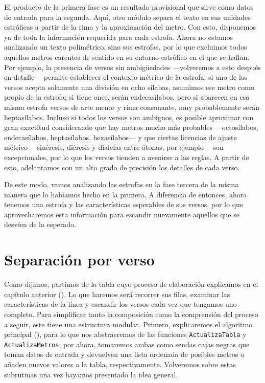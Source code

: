 El producto de la primera fase es un resultado provisional que sirve como datos de entrada para la segunda. Aquí, otro módulo separa el texto en sus unidades estróficas a partir de la rima y la aproximación del metro. Con esto, disponemos ya de toda la información requerida para cada estrofa. Ahora no estamos analizando un texto polimétrico, sino sus estrofas, por lo que excluimos todos aquellos metros carentes de sentido en su entorno estrófico en el que se hallan. Por ejemplo, la presencia de versos sin ambigüedades —volveremos a esto después en detalle— permite establecer el contexto métrico de la estrofa: si uno de los versos acepta solamente una división en ocho sílabas, asumimos ese metro como propio de la estrofa; si tiene once, serán endecasílabos, pero si aparecen en esa misma estrofa versos de arte menor y rima consonante, muy probablemente serán heptasílabos. Incluso si todos los versos son ambiguos, es posible aproximar con gran exactitud considerando que hay metros mucho más probables —octosílabos, endecasílabos, heptasílabos, hexasílabos— y que ciertas licencias de ajuste métrico —sinéresis, diéresis y dialefas entre átonas, por ejemplo— son excepcionales, por lo que los versos tienden a avenirse a las reglas. A partir de esto, adelantamos con un alto grado de precisión los detalles de cada verso.

De este modo, vamos analizando las estrofas en la fase tercera de la misma manera que lo habíamos hecho en la primera. A diferencia de entonces, ahora tenemos una estrofa y las características esperables de sus versos, por lo que aprovecharemos esta información para escandir nuevamente aquellos que se desvíen de lo esperado.

\section{Separación por verso}
	Como dijimos, partimos de la tabla cuyo proceso de elaboración explicamos en el capítulo anterior (). Lo que haremos será recorrer sus filas, examinar las características de la línea y escandir los versos cada vez que tengamos uno completo. Para simplificar tanto la composición como la comprensión del proceso a seguir, este tiene una estructura modular. Primero, explicaremos el algoritmo principal (), para lo que nos abstraeremos de las funciones \texttt{ActualizaTabla} y \texttt{ActualizaMetros}; por ahora, tomaremos ambas como sendas cajas negras que toman datos de entrada y devuelven una lista ordenada de posibles metros o añaden nuevos valores a la tabla, respectivamente. Volveremos sobre estas subrutinas una vez hayamos presentado la idea general.
	
